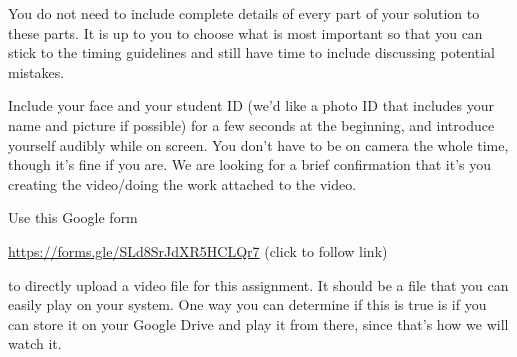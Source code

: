 \documentclass[12pt, oneside]{article}
\begin{document}
You do not need to include complete details of every part of your solution to these parts. 
It is up to you to choose what is most important so that you can stick to the 
timing guidelines and still have time to include discussing potential mistakes.

Include your face and your student ID (we'd like a photo ID that includes your name 
and picture if possible) for a few seconds at the beginning, and introduce yourself 
audibly while on screen. You don't have to be on camera the whole time, though it's fine 
if you are. We are looking for a brief confirmation that it's you creating the 
video/doing the work attached to the video.

Use this Google form

\url{https://forms.gle/SLd8SrJdXR5HCLQr7}  (click to follow link) 

to directly upload a video file for this assignment.
It should be a file that you can easily play on your system. 
One way you can determine if this is true is if you can store it on your Google Drive and play it from there,
since that's how we will watch it.
\end{document}
